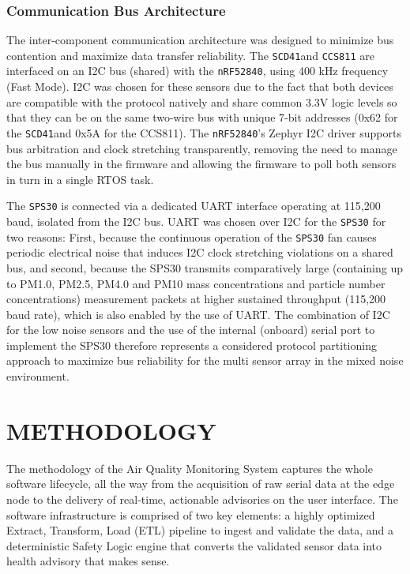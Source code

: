 \documentclass[conference]{IEEEtran}
\begin{document}
\subsubsection{Communication Bus Architecture}
The inter-component communication architecture was designed to minimize bus contention and maximize data transfer reliability. The \texttt{SCD41}and \texttt{CCS811} are interfaced on an I2C bus (shared) with the \texttt{nRF52840}, using 400 kHz frequency (Fast Mode). I2C was chosen for these sensors due to the fact that both devices are compatible with the protocol natively and share common 3.3V logic levels so that they can be on the same two-wire bus with unique 7-bit addresses (0x62 for the \texttt{SCD41}and 0x5A for the CCS811). The \texttt{nRF52840}'s Zephyr I2C driver supports bus arbitration and clock stretching transparently, removing the need to manage the bus manually in the firmware and allowing the firmware to poll both sensors in turn in a single RTOS task.

The \texttt{SPS30} is connected via a dedicated UART interface operating at 115,200 baud, isolated from the I2C bus. UART was chosen over I2C for the \texttt{SPS30} for two reasons: First, because the continuous operation of the \texttt{SPS30} fan causes periodic electrical noise that induces I2C clock stretching violations on a shared bus, and second, because the SPS30 transmits comparatively large (containing up to PM1.0, PM2.5, PM4.0 and PM10 mass concentrations and particle number concentrations) measurement packets at higher sustained throughput (115,200 baud rate), which is also enabled by the use of UART. The combination of I2C for the low noise sensors and the use of the internal (onboard) serial port to implement the SPS30 therefore represents a considered protocol partitioning approach to maximize bus reliability for the multi sensor array in the mixed noise environment.

\section{METHODOLOGY}
The methodology of the Air Quality Monitoring System captures the whole software lifecycle, all the way from the acquisition of raw serial data at the edge node to the delivery of real-time, actionable advisories on the user interface. The software infrastructure is comprised of two key elements: a highly optimized Extract, Transform, Load (ETL) pipeline to ingest and validate the data, and a deterministic Safety Logic engine that converts the validated sensor data into health advisory that makes sense.
\end{document}
